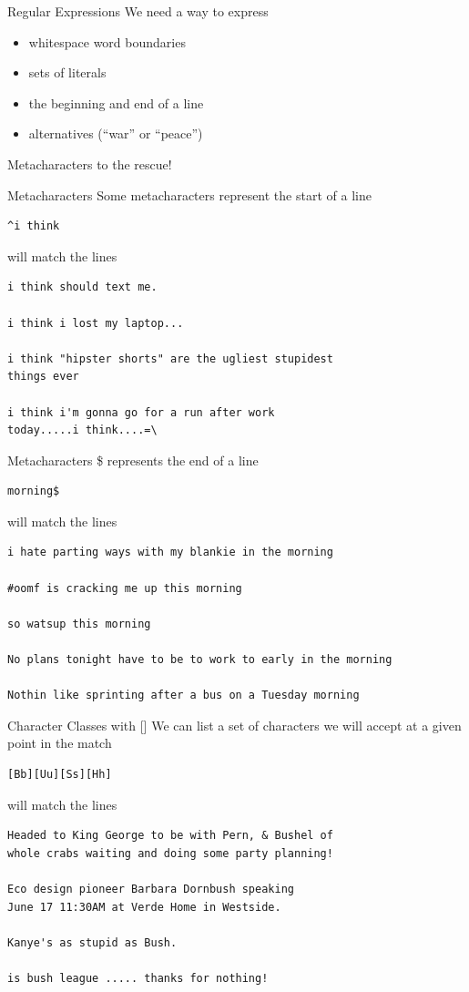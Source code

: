 \documentclass{beamer}
\begin{document}
\begin{frame}{Regular Expressions}
We need a way to express
\begin{itemize}
\item
whitespace word boundaries
\item
sets of literals
\item
the beginning and end of a line
\item
alternatives (``war'' or ``peace'')
\end{itemize}
Metacharacters to the rescue!
\end{frame}

\begin{frame}[fragile]{Metacharacters}
Some metacharacters represent the start of a line
\begin{verbatim}
^i think 
\end{verbatim}
will match the lines 
\begin{verbatim}
i think should text me.

i think i lost my laptop...

i think "hipster shorts" are the ugliest stupidest 
things ever

i think i'm gonna go for a run after work 
today.....i think....=\
\end{verbatim}
\end{frame}

\begin{frame}[fragile]{Metacharacters}
\$ represents the end of a line
\begin{verbatim}
morning$ 
\end{verbatim}
will match the lines 
\begin{verbatim}
i hate parting ways with my blankie in the morning

#oomf is cracking me up this morning

so watsup this morning

No plans tonight have to be to work to early in the morning

Nothin like sprinting after a bus on a Tuesday morning
\end{verbatim}
\end{frame}

\begin{frame}[fragile]{Character Classes with []}
We can list a set of characters we will accept at a given point in the
match
\begin{verbatim}
[Bb][Uu][Ss][Hh]
\end{verbatim}
will match the lines 
\begin{verbatim}
Headed to King George to be with Pern, & Bushel of 
whole crabs waiting and doing some party planning!

Eco design pioneer Barbara Dornbush speaking 
June 17 11:30AM at Verde Home in Westside.

Kanye's as stupid as Bush.

is bush league ..... thanks for nothing!
\end{verbatim}
\end{frame}
\end{document}
